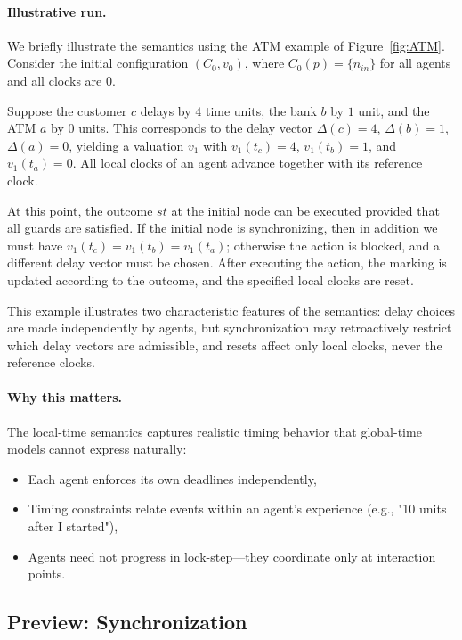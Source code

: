 \paragraph{Illustrative run.}
We briefly illustrate the semantics using the ATM example of
Figure~\ref{fig:ATM}.  Consider the initial configuration $(C_0,v_0)$, where
$C_0(p)=\{n_{in}\}$ for all agents and all clocks are $0$.

Suppose the customer $c$ delays by $4$ time units, the bank $b$ by $1$ unit, and
the ATM $a$ by $0$ units.  This corresponds to the delay vector
$\Delta(c)=4$, $\Delta(b)=1$, $\Delta(a)=0$, yielding a valuation $v_1$ with
$v_1(t_c)=4$, $v_1(t_b)=1$, and $v_1(t_a)=0$.  All local clocks of an agent advance
together with its reference clock.

At this point, the outcome $st$ at the initial node can be executed provided that
all guards are satisfied.  If the initial node is synchronizing, then in addition
we must have $v_1(t_c)=v_1(t_b)=v_1(t_a)$; otherwise the action is blocked, and a
different delay vector must be chosen.  After executing the action, the marking
is updated according to the outcome, and the specified local clocks are reset.

This example illustrates two characteristic features of the semantics: delay
choices are made independently by agents, but synchronization may retroactively
restrict which delay vectors are admissible, and resets affect only local clocks,
never the reference clocks.

\paragraph{Why this matters.} The local-time semantics captures realistic timing behavior that global-time models cannot express naturally:
\begin{itemize}
\item Each agent enforces its own deadlines independently,
\item Timing constraints relate events within an agent's experience (e.g., "10 units after I started"),
\item Agents need not progress in lock-step—they coordinate only at interaction points.
\end{itemize}

\subsection{Preview: Synchronization}

